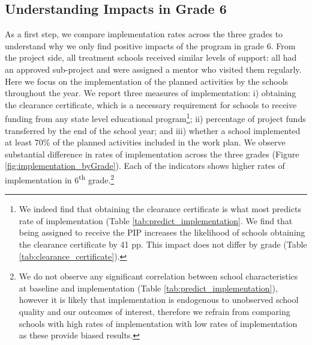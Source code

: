 \documentclass[11pt,a4paper]{article}
\begin{document}
\subsection{Understanding Impacts in Grade 6}

As a first step, we compare implementation rates across the three grades to understand why we only find positive impacts of the program in grade 6. From the project side, all treatment schools received similar levels of support: all had an approved sub-project and were assigned a mentor who visited them regularly. Here we focus on the implementation of the planned activities by the schools throughout the year. We report three measures of implementation: i) obtaining the clearance certificate, which is a necessary requirement for schools to receive funding from any state level educational program\footnote{We indeed find that obtaining the clearance certificate is what most predicts rate of implementation (Table \ref{tab:predict_implementation}. We find that being assigned to receive the PIP increases the likelihood of schools obtaining the clearance certificate by 41 pp. This impact does not differ by grade (Table \ref{tab:clearance_certificate}).}; ii) percentage of project funds transferred by the end of the school year; and iii) whether a school implemented at least 70\% of the planned activities included in the work plan. We observe substantial difference in rates of implementation across the three grades (Figure \ref{fig:implementation_byGrade}). Each of the indicators shows higher rates of implementation in 6\textsuperscript{th} grade.\footnote{We do not observe any significant correlation between school characteristics at baseline and implementation (Table \ref{tab:predict_implementation}), however it is likely that implementation is endogenous to unobserved school quality and our outcomes of interest, therefore we refrain from comparing schools with high rates of implementation with low rates of implementation as these provide biased results.} 
\end{document}

